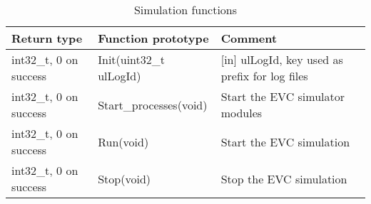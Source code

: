 \documentclass{template/openetcs_article}
\begin{document}
\begin{longtable}{|l|l|l|}
	\caption{Simulation functions} \\ 
	\hline
		\begin{minipage}[t]{0.25\linewidth} \textbf{Return type} \end{minipage}
	&	\begin{minipage}[t]{0.30\linewidth} \textbf{Function prototype} \end{minipage} 
	&	\begin{minipage}[t]{0.50\linewidth} \textbf{Comment} \end{minipage} \\
	\hline
		\begin{minipage}[t]{0.25\linewidth} int32\_t, 0 on success \end{minipage} 
	&	\begin{minipage}[t]{0.30\linewidth} Init(uint32\_t ulLogId) \end{minipage} 
	&	\begin{minipage}[t]{0.50\linewidth} [in] ulLogId, key used as prefix for log files \end{minipage} \\
	\hline
		\begin{minipage}[t]{0.25\linewidth} int32\_t, 0 on success \end{minipage} 
	&	\begin{minipage}[t]{0.30\linewidth} Start\_processes(void) \end{minipage} 
	&	\begin{minipage}[t]{0.50\linewidth} Start the EVC simulator modules \end{minipage} \\
	\hline
		\begin{minipage}[t]{0.25\linewidth} int32\_t, 0 on success \end{minipage} 
	&	\begin{minipage}[t]{0.30\linewidth} Run(void) \end{minipage} 
	&	\begin{minipage}[t]{0.50\linewidth} Start the EVC simulation \end{minipage} \\
	\hline
		\begin{minipage}[t]{0.25\linewidth} int32\_t, 0 on success	\end{minipage} 
	&	\begin{minipage}[t]{0.30\linewidth} Stop(void) \end{minipage} 
	&	\begin{minipage}[t]{0.50\linewidth} Stop the EVC simulation \end{minipage} \\

\end{longtable}
\end{document}
